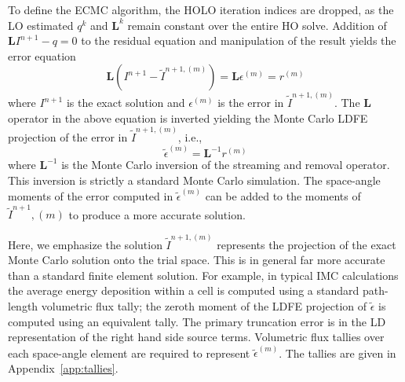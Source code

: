 \documentclass{mc2013}
\newcommand{\B}[1]{\ensuremath{\mathbf{#1}}}
\begin{document}
To define the ECMC algorithm, the HOLO iteration indices
are dropped, as the LO estimated $q^{k}$ and $\B L^{k}$ remain constant over the entire HO solve.
Addition of $\B L I^{n+1} - q=0$ to the residual equation 
and manipulation of the result yields the error equation
\begin{equation}
    \B L (I^{n+1} - \tilde{I}^{n+1,(m)}) = \B L {\epsilon}^{(m)} = r^{(m)}
\end{equation}
where $I^{n+1}$ is the exact solution and ${\epsilon}^{(m)}$ is the error in
$\tilde{I}^{n+1,(m)}$. The $\B L$ operator in the above equation is inverted yielding
the Monte Carlo LDFE projection of the error in $\tilde{I}^{n+1,(m)}$, i.e., 
\begin{equation}
\tilde{\epsilon}^{(m)} = \B L^{-1} r^{(m)}
\end{equation}
where $\B L^{-1}$ is the Monte Carlo inversion of the streaming and removal operator.
This inversion is strictly a standard Monte Carlo simulation.  The space-angle moments of the
error computed in $\tilde{\epsilon}^{(m)}$ can be added to the moments of
$\tilde{I}^{n+1},(m)$ to produce a more accurate solution.

Here, we emphasize the solution $\tilde{I}^{n+1,(m)}$ represents the projection of the exact Monte Carlo
solution onto the trial space.  This is in general far more accurate than a standard
finite element solution.  For example, in typical IMC calculations the average energy
deposition within a cell is computed using a standard path-length volumetric flux
tally; the zeroth moment of the LDFE projection of $\tilde{\epsilon}$ is computed
using an equivalent tally.  The primary truncation error is in the LD
representation of the right hand side source terms.  Volumetric flux tallies over
each space-angle element are required to represent $\tilde{\epsilon}^{(m)}$.  The
tallies are given in Appendix~\ref{app:tallies}.
\end{document}
